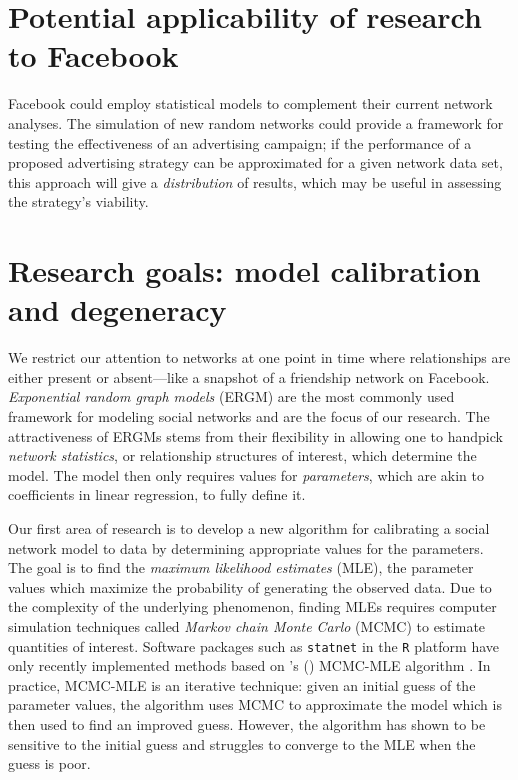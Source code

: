 \documentclass[12pt]{article}
\begin{document}
\section{Potential applicability of research to Facebook}
Facebook could employ statistical models to complement their current network analyses.  The simulation of new random networks could provide a framework for testing the effectiveness of an advertising campaign; if the performance of a proposed advertising strategy can be approximated for a given network data set, this approach will give a \textit{distribution} of results, which may be useful in assessing the strategy's viability.

\section{Research goals: model calibration and degeneracy}
We restrict our attention to networks at one point in time where relationships are either present or absent---like a snapshot of a friendship network on Facebook.  \textit{Exponential random graph models} (ERGM) are the most commonly used framework for modeling social networks and are the focus of our research.  The attractiveness of ERGMs stems from their flexibility in allowing one to handpick \textit{network statistics}, or relationship structures of interest, which determine the model.  The model then only requires values for \textit{parameters}, which are akin to coefficients in linear regression, to fully define it.  

Our first area of research is to develop a new algorithm for calibrating a social network model to data by determining appropriate values for the parameters.  The goal is to find the \textit{maximum likelihood estimates} (MLE), the parameter values which maximize the probability of generating the observed data.  Due to the complexity of the underlying phenomenon, finding MLEs requires computer simulation techniques called \textit{Markov chain Monte Carlo} (MCMC) to estimate quantities of interest.  Software packages such as \texttt{statnet} in the \texttt{R} platform have only recently implemented methods based on \citeauthor{Geyer:1992}'s (\citeyear{Geyer:1992}) MCMC-MLE algorithm \citep{statnet:R}.  In practice, MCMC-MLE is an iterative technique: given an initial guess of the parameter values, the algorithm uses MCMC to approximate the model which is then used to find an improved guess.  However, the algorithm has shown to be sensitive to the initial guess and struggles to converge to the MLE when the guess is poor.
\end{document}
